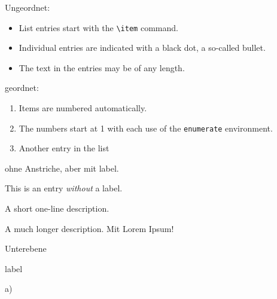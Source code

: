 \documentclass[a4paper, 12pt]{article}
\begin{document}





Ungeordnet:
\begin{itemize}
  \item List entries start with the \verb|\item| command.
  \item Individual entries are indicated with a black dot, a so-called bullet.
  \item The text in the entries may be of any length.
\end{itemize}

geordnet:
\begin{enumerate}
  \item Items are numbered automatically.
  \item The numbers start at 1 with each use of the \texttt{enumerate} environment.
  \item Another entry in the list
\end{enumerate}

ohne Anstriche, aber mit label.
\begin{description}
   \item This is an entry \textit{without} a label.
   \item[Something short] A short one-line description.
   \item[Something long] A much longer description. Mit Lorem Ipsum! \blindtext[1]
        \item Unterebene 
\end{description}


\item[label] %
\item[a)] %
\end{document}
